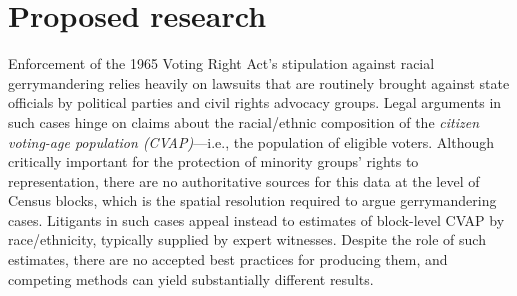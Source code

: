 \documentclass[11pt]{article}
\begin{document}




\section*{Proposed research}

Enforcement of the 1965 Voting Right Act's stipulation against racial gerrymandering relies heavily on lawsuits that are routinely brought against state officials by political parties and civil rights advocacy groups. Legal arguments in such cases hinge on claims about the racial/ethnic composition of the \textit{citizen voting-age population (CVAP)}---i.e., the population of eligible voters. Although critically important for the protection of minority groups' rights to representation, there are no authoritative sources for this data at the level of Census blocks, which is the spatial resolution required to argue gerrymandering cases. Litigants in such cases appeal instead to estimates of block-level CVAP by race/ethnicity, typically supplied by expert witnesses. Despite the role of such estimates, there are no accepted best practices for producing them, and competing methods can yield substantially different results.~
\end{document}
